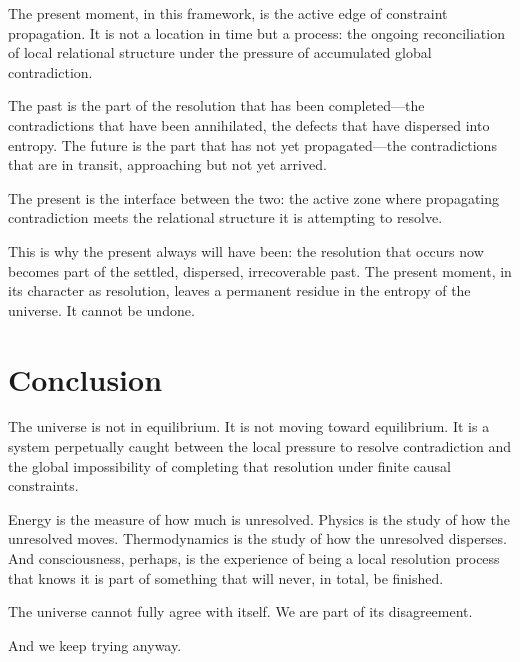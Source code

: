 \documentclass[12pt,a4paper,openany]{book}
\theoremstyle{plain}
\theoremstyle{definition}
\theoremstyle{remark}
\begin{document}
The present moment, in this framework, is the active edge of constraint propagation. It is not a location in time but a process: the ongoing reconciliation of local relational structure under the pressure of accumulated global contradiction.

The past is the part of the resolution that has been completed---the contradictions that have been annihilated, the defects that have dispersed into entropy. The future is the part that has not yet propagated---the contradictions that are in transit, approaching but not yet arrived.

The present is the interface between the two: the active zone where propagating contradiction meets the relational structure it is attempting to resolve.

This is why the present always will have been: the resolution that occurs now becomes part of the settled, dispersed, irrecoverable past. The present moment, in its character as resolution, leaves a permanent residue in the entropy of the universe. It cannot be undone.

\section{Conclusion}

The universe is not in equilibrium. It is not moving toward equilibrium. It is a system perpetually caught between the local pressure to resolve contradiction and the global impossibility of completing that resolution under finite causal constraints.

Energy is the measure of how much is unresolved. Physics is the study of how the unresolved moves. Thermodynamics is the study of how the unresolved disperses. And consciousness, perhaps, is the experience of being a local resolution process that knows it is part of something that will never, in total, be finished.

The universe cannot fully agree with itself. We are part of its disagreement.

And we keep trying anyway.
\end{document}
